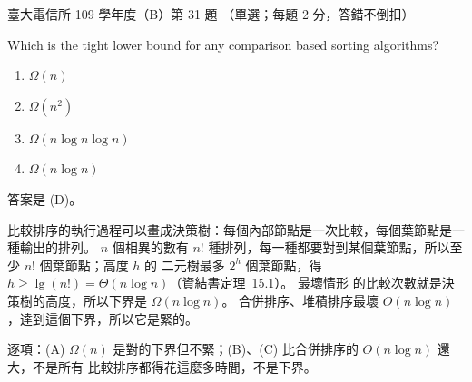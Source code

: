 \begin{pastexam}[label={px:ntu-109-comm-dsa-31}]{臺大電信所 109 學年度（B）第 31 題}
（單選；每題 2 分，答錯不倒扣）

Which is the tight lower bound for any comparison based sorting algorithms?
\begin{enumerate}[label=(\Alph*)]
\item $\Omega(n)$
\item $\Omega(n^2)$
\item $\Omega(n\log n\log n)$
\item $\Omega(n\log n)$
\end{enumerate}
\end{pastexam}

\begin{pastsoln}
答案是 (D)。

比較排序的執行過程可以畫成決策樹：每個內部節點是一次比較，每個葉節點是一種輸出的排列。
$n$ 個相異的數有 $n!$ 種排列，每一種都要對到某個葉節點，所以至少 $n!$ 個葉節點；高度 $h$ 的
二元樹最多 $2^h$ 個葉節點，得 $h \ge \lg(n!) = \Theta(n \log n)$（資結書定理~15.1）。 最壞情形
的比較次數就是決策樹的高度，所以下界是 $\Omega(n \log n)$。 合併排序、堆積排序最壞
$O(n \log n)$，達到這個下界，所以它是緊的。

逐項：(A) $\Omega(n)$ 是對的下界但不緊；(B)、(C) 比合併排序的 $O(n\log n)$ 還大，不是所有
比較排序都得花這麼多時間，不是下界。
\end{pastsoln}
